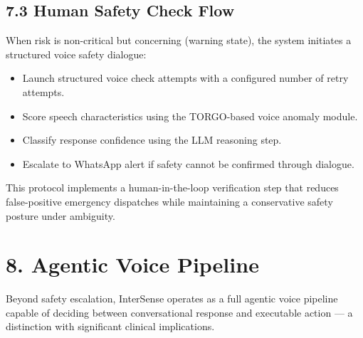 \documentclass[11pt,a4paper]{article}
\begin{document}
\subsection{7.3 Human Safety Check Flow}
When risk is non-critical but concerning (warning state), the system initiates a structured voice safety dialogue:
\begin{itemize}[leftmargin=1.4em]
  \item Launch structured voice check attempts with a configured number of retry attempts.
  \item Score speech characteristics using the TORGO-based voice anomaly module.
  \item Classify response confidence using the LLM reasoning step.
  \item Escalate to WhatsApp alert if safety cannot be confirmed through dialogue.
\end{itemize}
This protocol implements a human-in-the-loop verification step that reduces false-positive emergency dispatches while maintaining a conservative safety posture under ambiguity.

\section{8. Agentic Voice Pipeline}
Beyond safety escalation, InterSense operates as a full agentic voice pipeline capable of deciding between conversational response and executable action — a distinction with significant clinical implications.
\end{document}
